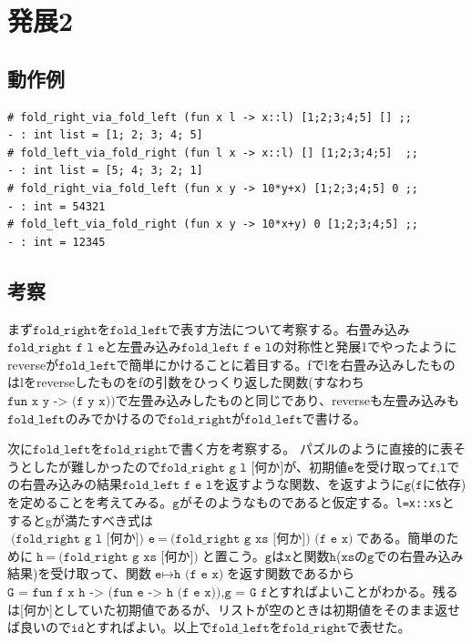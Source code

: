 \documentclass[11pt,a4paper]{jsarticle}
\begin{document}
\section*{発展2}
\subsection*{動作例}
\begin{lstlisting}[basicstyle=\ttfamily\footnotesize, frame=single]
# fold_right_via_fold_left (fun x l -> x::l) [1;2;3;4;5] [] ;;
- : int list = [1; 2; 3; 4; 5]
# fold_left_via_fold_right (fun l x -> x::l) [] [1;2;3;4;5]  ;;
- : int list = [5; 4; 3; 2; 1]
# fold_right_via_fold_left (fun x y -> 10*y+x) [1;2;3;4;5] 0 ;;
- : int = 54321
# fold_left_via_fold_right (fun x y -> 10*x+y) 0 [1;2;3;4;5] ;;
- : int = 12345
 \end{lstlisting}
\subsection*{考察}
まず$\texttt{fold\_right}$を$\texttt{fold\_left}$で表す方法について考察する。右畳み込み$\texttt{fold\_right\ f\ l\ e}$と左畳み込み$\texttt{fold\_left\ f\ e\ l}$の対称性と発展1でやったようにreverseが$\texttt{fold\_left}$で簡単にかけることに着目する。fでlを右畳み込みしたものはlをreverseしたものをfの引数をひっくり返した関数(すなわち$\texttt{fun x y -> (f y x))}$で左畳み込みしたものと同じであり、reverseも左畳み込みも$\texttt{fold\_left}$のみでかけるので$\texttt{fold\_right}$が$\texttt{fold\_left}$で書ける。\par
次に$\texttt{fold\_left}$を$\texttt{fold\_right}$で書く方を考察する。
パズルのように直接的に表そうとしたが難しかったので$\texttt{fold\_right\ g\ l\ [何か]}$が、初期値$\texttt{e}$を受け取って$\texttt{f,l}$での右畳み込みの結果$\texttt{fold\_left\ f\ e\ l}$を返すような関数、を返すように$\texttt{g}$($\texttt{f}$に依存)を定めることを考えてみる。$\texttt{g}$がそのようなものであると仮定する。\texttt{l=x::xs}とするとgが満たすべき式は$\texttt{(fold\_right\ g\ l\ [何か])\ e}\ =\ \texttt{(fold\_right\ g\ xs\ [何か])\ (f\ e\ x)}$である。簡単のために$\texttt{h}\ =\ \texttt{(fold\_right\ g\ xs\ [何か])}$と置こう。$\texttt{g}$は$\texttt{x}$と関数$\texttt{h}$($\texttt{xs}$の$\texttt{g}$での右畳み込み結果)を受け取って、関数$\texttt{e}\mapsto\texttt{h\ (f\ e\ x)}$を返す関数であるから$\texttt{G\ =\ fun\ f\ x\ h\ ->\ (fun\ e\ ->\ h\ (f\ e\ x))}$,$\texttt{g\ =\ G f}$とすればよいことがわかる。残るは[何か]としていた初期値であるが、リストが空のときは初期値をそのまま返せば良いので$\texttt{id}$とすればよい。以上で$\texttt{fold\_left}$を$\texttt{fold\_right}$で表せた。
\end{document}
